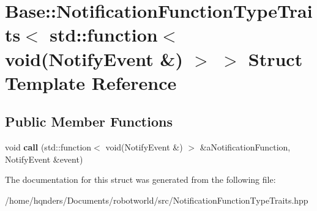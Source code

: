\hypertarget{struct_base_1_1_notification_function_type_traits_3_01std_1_1function_3_01void_07_notify_event_01_6_08_01_4_01_4}{}\section{Base\+:\+:Notification\+Function\+Type\+Traits$<$ std\+:\+:function$<$ void(Notify\+Event \&) $>$ $>$ Struct Template Reference}
\label{struct_base_1_1_notification_function_type_traits_3_01std_1_1function_3_01void_07_notify_event_01_6_08_01_4_01_4}
\subsection*{Public Member Functions}
\begin{DoxyCompactItemize}
\item 
void {\bfseries call} (std\+::function$<$ void(Notify\+Event \&) $>$ \&a\+Notification\+Function, Notify\+Event \&event)\hypertarget{struct_base_1_1_notification_function_type_traits_3_01std_1_1function_3_01void_07_notify_event_01_6_08_01_4_01_4_a4afd550536d560f3e74fd65452b454d2}{}\label{struct_base_1_1_notification_function_type_traits_3_01std_1_1function_3_01void_07_notify_event_01_6_08_01_4_01_4_a4afd550536d560f3e74fd65452b454d2}

\end{DoxyCompactItemize}


The documentation for this struct was generated from the following file\+:\begin{DoxyCompactItemize}
\item 
/home/hqnders/\+Documents/robotworld/src/Notification\+Function\+Type\+Traits.\+hpp\end{DoxyCompactItemize}
